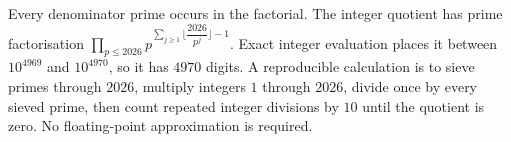 Every denominator prime occurs in the factorial. The integer quotient has prime factorisation $\prod_{p\le2026}p^{\sum_{j\ge1}\lfloor\dfrac{2026}{p^j}\rfloor-1}$. Exact integer evaluation places it between $10^{4969}$ and $10^{4970}$, so it has $\boxed{4970}$ digits. A reproducible calculation is to sieve primes through $2026$, multiply integers $1$ through $2026$, divide once by every sieved prime, then count repeated integer divisions by $10$ until the quotient is zero. No floating-point approximation is required.
